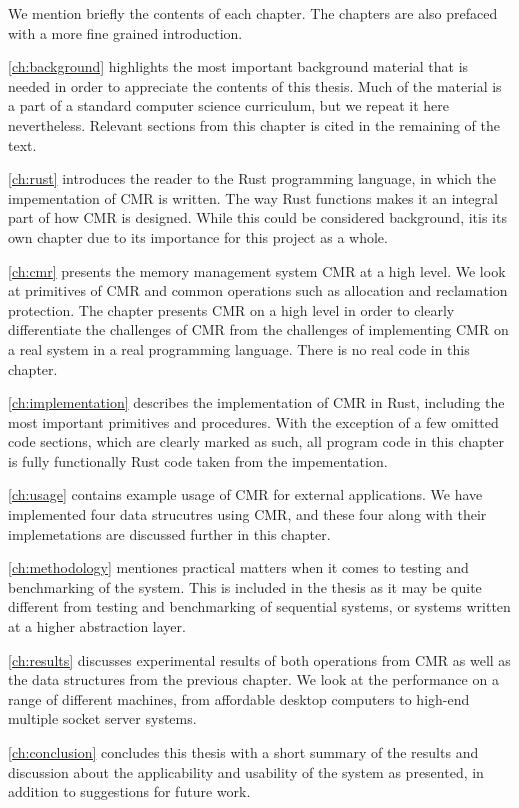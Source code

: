 We mention briefly the contents of each chapter. The chapters are also prefaced with a more fine
grained introduction.

\cref{ch:background} highlights the most important background material that is needed in order to
appreciate the contents of this thesis. Much of the material is a part of a standard computer
science curriculum, but we repeat it here nevertheless. Relevant sections from this chapter is
cited in the remaining of the text.

\cref{ch:rust} introduces the reader to the Rust programming language, in which the impementation
of CMR is written. The way Rust functions makes it an integral part of how CMR is designed. While
this could be considered background, itis its own chapter due to its importance for this project as
a whole.

\cref{ch:cmr} presents the memory management system CMR at a high level.  We look at primitives of
CMR and common operations such as allocation and reclamation protection.  The chapter presents CMR
on a high level in order to clearly differentiate the challenges of CMR from the challenges of
implementing CMR on a real system in a real programming language. There is no real code in this
chapter.

\cref{ch:implementation} describes the implementation of CMR in Rust, including the most important
primitives and procedures. With the exception of a few omitted code sections, which are clearly
marked as such, all program code in this chapter is fully functionally Rust code taken from the
impementation.

\cref{ch:usage} contains example usage of CMR for external applications. We have implemented four
data strucutres using CMR, and these four along with their implemetations are discussed further in
this chapter.

\cref{ch:methodology} mentiones practical matters when it comes to testing and benchmarking of the
system. This is included in the thesis as it may be quite different from testing and benchmarking
of sequential systems, or systems written at a higher abstraction layer.

\cref{ch:results} discusses experimental results of both operations from CMR as well as the data
structures from the previous chapter. We look at the performance on a range of different machines,
from affordable desktop computers to high-end multiple socket server systems.

\cref{ch:conclusion} concludes this thesis with a short summary of the results and discussion about
the applicability and usability of the system as presented, in addition to suggestions for future
work.
